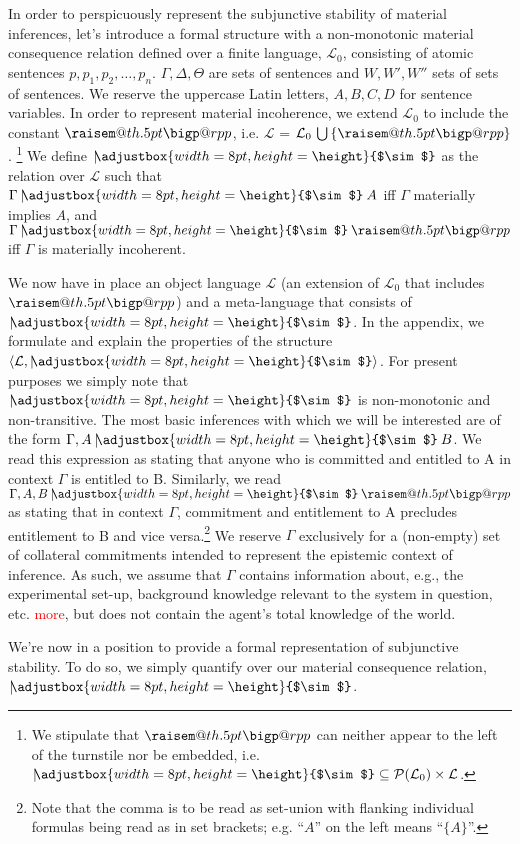 \documentclass{svjour3}                     %
\makeatletter
\newcommand{\raisemath}[1]{\mathpalette{\raisem@th{#1}}}
\newcommand{\raisem@th}[3]{\raisebox{#1}{$#2#3$}}
\newcommand{\bigperpp}{%
  \mathop{\mathpalette\bigp@rpp\relax}%
  \displaylimits
}
\newcommand{\bigp@rpp}[2]{%
  \vcenter{
    \m@th\hbox{\scalebox{\ifx#1\displaystyle1.3\else1.3\fi}{$#1\perp$}}
  }%
}
\newcommand{\bigperp}{\raisemath{.5pt}{\bigperpp}}
\newcommand{\ssim}{%
     \setbox0=\hbox{$\sim$}%
     \adjustbox{width=8pt,height=\height}{$\sim$}
}
\newcommand{\nmc}{\mathbin{\mid\joinrel\!\!\ssim}}
\makeatother
\begin{document}
In order to perspicuously represent the subjunctive stability of material inferences, let's introduce a formal structure with a non-monotonic material consequence relation defined over a finite language, $ \mathcal{L}_{0} $, consisting of atomic sentences $ p, p_1, p_2, \ldots, p_n$. $ \Gamma, \Delta, \Theta $ are sets of sentences and $ W, W',W'' $ sets of sets of sentences. We reserve the uppercase Latin letters, $ A, B, C, D $ for sentence variables. In order to represent material incoherence, we extend $ \mathcal{L}_0 $ to include the constant $ \bigperp $, i.e. $ \mathcal{L} $ = $ \mathcal{L}_0 \,\bigcup \,\{\bigperp\}$. \footnote{We stipulate that $ \bigperp $ can neither appear to the left of the turnstile nor be embedded, i.e. $ {\nmc} \subseteq \mathcal{P}(\mathcal{L}_0) \times \mathcal{L} $.} We define $ \nmc $ as the relation over $ \mathcal{L} $ such that $  \Gamma\nmc A $ iff  $\Gamma$ materially implies $ A $, and $\Gamma\nmc \bigperp $ iff $ \Gamma $ is materially incoherent. 

We now have in place an object language $ \mathcal{L} $ (an extension of  $ \mathcal{L}_0 $ that includes $ \bigperp $) and a meta-language that consists of $ \nmc $.  In the appendix, we formulate and explain the properties of the structure $ \langle \mathcal{L}, \nmc \rangle  $. For present purposes we simply note that $ \nmc $ is non-monotonic and non-transitive.  The most basic inferences with which we will be interested are of the form $ \Gamma, A \nmc B $.  We read this expression as stating that anyone who is committed and entitled to A in context $ \Gamma $ is entitled to B. Similarly, we read  $\Gamma, A, B \nmc \bigperp $ as stating that in context $ \Gamma $, commitment and entitlement to A  precludes entitlement to B and vice versa.\footnote{Note that the comma is to be read as set-union with flanking individual formulas being read as in set brackets; e.g. ``$ A $'' on the left means ``$ \{ A\} $''.}  We reserve $ \Gamma $ exclusively for a (non-empty) set of collateral commitments intended to represent the epistemic context of inference. As such, we assume that $ \Gamma $ contains information about, e.g., the experimental set-up, background knowledge relevant to the system in question, etc. \textcolor{red}{more}, but does not contain the agent's total knowledge of the world. 

We're now in a position to provide a formal representation of subjunctive stability. To do so, we simply quantify over our material consequence relation, $ \nmc $. \newline
\end{document}
